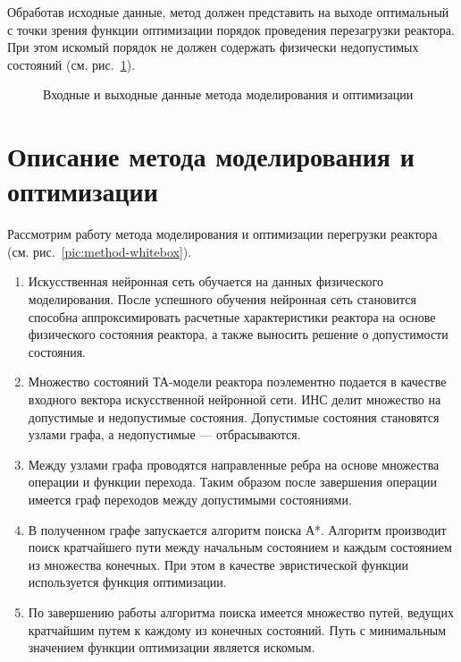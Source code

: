 Обработав исходные данные, метод должен представить на выходе оптимальный с точки зрения функции оптимизации порядок проведения перезагрузки реактора. 
При этом искомый порядок не должен содержать физически недопустимых состояний (см. рис.~\ref{pic:method-blackbox}).


\begin{figure}[ht]
\caption{Входные и выходные данные метода моделирования и оптимизации}
\label{pic:method-blackbox}
\end{figure}

\section{Описание метода моделирования и оптимизации}

Рассмотрим работу метода моделирования и оптимизации перегрузки реактора (см. рис.~\ref{pic:method-whitebox}).

\begin{enumerate}
 \item Искусственная нейронная сеть обучается на данных физического моделирования.
 После успешного обучения нейронная сеть становится способна аппроксимировать расчетные характеристики реактора на основе физического состояния реактора, а также выносить решение о допустимости состояния.
 
 \item Множество состояний ТА-модели реактора поэлементно подается в качестве входного вектора искусственной нейронной сети.
 ИНС делит множество на допустимые и недопустимые состояния.
 Допустимые состояния становятся узлами графа, а недопустимые --- отбрасываются.
 
 \item Между узлами графа проводятся направленные ребра на основе множества операции и функции перехода.
 Таким образом после завершения операции имеется граф переходов между допустимыми состояниями.
 
 \item В полученном графе запускается алгоритм поиска А*.
 Алгоритм производит поиск кратчайшего пути между начальным состоянием и каждым состоянием из множества конечных.
 При этом в качестве эвристической функции используется функция оптимизации.
 
 \item По завершению работы алгоритма поиска имеется множество путей, ведущих кратчайшим путем к каждому из конечных состояний.
 Путь с минимальным значением функции оптимизации является искомым.
 
\end{enumerate}

